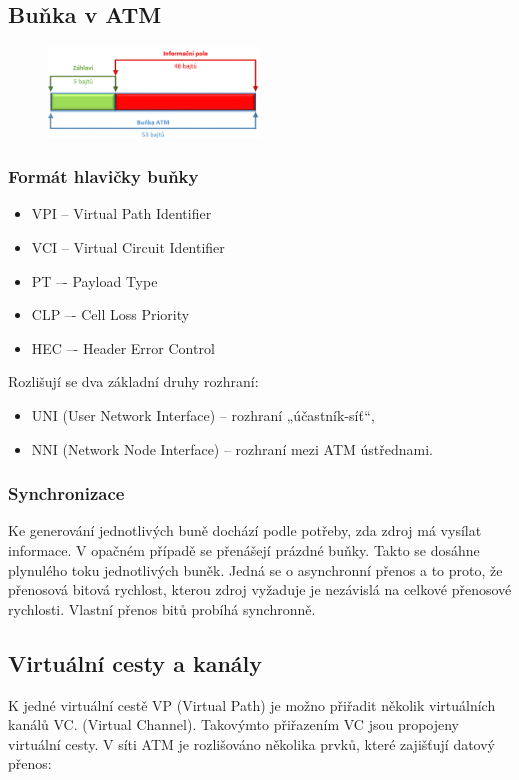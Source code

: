 \subsection{Buňka v ATM}
\begin{figure} [h]
    \centering
    \includegraphics[width=0.5\textwidth]{snimky/ATM bunka.png}
    \label{fig:uml}
\end{figure}

\subsubsection{Formát hlavičky buňky}
\begin{itemize}
    \item VPI -- Virtual Path Identifier
    \item VCI -- Virtual Circuit Identifier
    \item PT –- Payload Type
    \item CLP –- Cell Loss Priority
    \item HEC –- Header Error Control
\end{itemize}

Rozlišují se dva základní druhy rozhraní:
\begin{itemize}
    \item UNI (User Network Interface) – rozhraní „účastník-síť“,
    \item NNI (Network Node Interface) – rozhraní mezi ATM ústřednami.
\end{itemize}

\subsubsection{Synchronizace}
Ke generování jednotlivých buně dochází podle potřeby, zda zdroj má vysílat informace. V opačném případě se přenášejí prázdné buňky. Takto se dosáhne
plynulého toku jednotlivých buněk. Jedná se o asynchronní přenos a to proto, že přenosová bitová rychlost, kterou zdroj vyžaduje je nezávislá na celkové přenosové rychlosti.  Vlastní přenos bitů probíhá synchronně. 

\subsection{Virtuální cesty a kanály}
K jedné virtuální cestě VP (Virtual Path) je možno přiřadit několik virtuálních kanálů VC. (Virtual Channel). Takovýmto přiřazením VC jsou propojeny virtuální cesty. V síti ATM je rozlišováno několika prvků, které zajišťují datový přenos:


